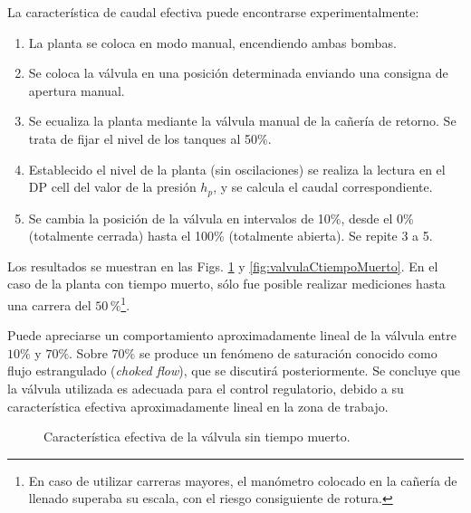 La característica de caudal efectiva puede encontrarse experimentalmente:
\begin{enumerate}
 \item La planta se coloca en modo manual, encendiendo ambas bombas.
 \item Se coloca la válvula en una posición determinada enviando una consigna
de apertura manual.
 \item Se ecualiza la planta mediante la válvula manual de la cañería de
retorno. Se trata de fijar el nivel de los tanques al 50\%.
 \item Establecido el nivel de la planta (sin oscilaciones) se realiza la
lectura en el DP cell del valor de la presión $h_p$,
y se calcula el caudal correspondiente.
 \item Se cambia la posición de la válvula en intervalos de
 10\%, desde el 0\% (totalmente cerrada) hasta el 100\% (totalmente abierta).
Se repite 3 a 5.
\end{enumerate}

Los resultados se muestran en las Figs. \ref{fig:valvulaStiempoMuerto} y
\ref{fig:valvulaCtiempoMuerto}.
En el caso de la planta con tiempo muerto, sólo fue posible realizar mediciones
hasta una carrera del $50\,\%$\footnote{En caso de utilizar carreras mayores,
el manómetro colocado en la cañería de llenado superaba su escala, con el
riesgo consiguiente de rotura.}.

Puede apreciarse un comportamiento aproximadamente lineal de la válvula entre
$10\%$ y $70\%$.
Sobre $70\%$  se produce un fenómeno de saturación conocido como flujo
estrangulado (\emph{choked flow}), que se discutirá posteriormente.
Se concluye que la válvula utilizada es adecuada para el
control regulatorio, debido a su característica efectiva aproximadamente lineal
en la zona de trabajo.

\begin{figure}[ht]
  \centering
\caption{Característica efectiva de la válvula sin tiempo muerto.}
\label{fig:valvulaStiempoMuerto}
\end{figure}

